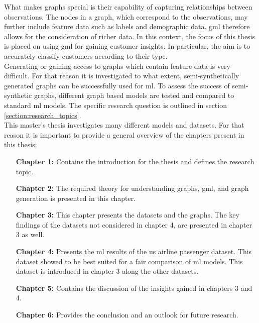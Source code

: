 	\noindent What makes graphs special is their capability of capturing
	relationships between observations. The nodes in a graph, which correspond
	to the observations, may further include feature data such as labels and
	demographic data. \acs{gml} therefore allows for the
	consideration of richer data. In this context, the focus of this thesis is 
	placed on using \acs{gml} for gaining customer insights. In
	particular, the aim is to accurately classify customers according to their
	type. \\

	\noindent Generating or gaining access to graphs which contain feature data 
	is very difficult. For that reason it is investigated to what extent,
	semi-synthetically generated graphs can be successfully used for \ac{ml}. 
	To assess the success of semi-synthetic graphs, different graph based models 
	are tested and compared to standard \acs{ml} models. The specific 
	research question is outlined in section \ref{section:research_topics}. \\

	\noindent This master's thesis investigates many different models and
	datasets. For that reason it is important to provide a general overview of
	the chapters present in this thesis:

	\begin{itemize}[leftmargin=1.0in] 
		\item[\textbf{Chapter 1:}] Contains the introduction for the thesis and 
			defines the research topic.
		\item[\textbf{Chapter 2:}] The required theory for understanding
			graphs, \acs{gml}, and graph generation is presented in this 
			chapter.
		\item[\textbf{Chapter 3:}] This chapter presents the datasets and the 
			graphs. The key findings of the datasets not considered in chapter
			4, are presented in chapter 3 as well. 
		\item[\textbf{Chapter 4:}] Presents the \acs{ml} results of the
			\acs{us} airline passenger dataset. This dataset showed to be best 
			suited for a fair comparison of \acs{ml} models. This dataset is 
			introduced in chapter 3 along the other datasets.
		\item[\textbf{Chapter 5:}]  Contains the discussion of the insights 
			gained in chapters 3 and 4.
		\item[\textbf{Chapter 6:}] Provides the conclusion and an outlook for 
			future research.
	\end{itemize}


